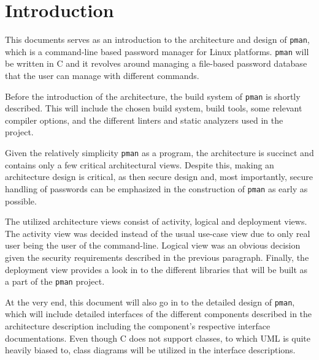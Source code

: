 \section{Introduction}

This documents serves as an introduction to the architecture and design of
\texttt{pman}, which is a command-line based password manager for Linux
platforms. \texttt{pman} will be written in C and it revolves around managing a
file-based password database that the user can manage with different commands.

Before the introduction of the architecture, the build system of \texttt{pman}
is shortly described. This will include the chosen build system, build tools,
some relevant compiler options, and the different linters and static analyzers
used in the project.

Given the relatively simplicity \texttt{pman} as a program, the architecture
is succinct and contains only a few critical architectural views. Despite this,
making an architecture design is critical, as then secure design and, most
importantly, secure handling of passwords can be emphasized in the construction
of \texttt{pman} as early as possible.

The utilized architecture views consist of activity, logical and deployment views.
The activity view was decided instead of the usual use-case view due to only real
user being the user of the command-line. Logical view was an obvious decision given
the security requirements described in the previous paragraph. Finally, the
deployment view provides a look in to the different libraries that will be
built as a part of the \texttt{pman} project.

At the very end, this document will also go in to the detailed design of
\texttt{pman}, which will include detailed interfaces of the different components
described in the architecture description including the component's respective
interface documentations. Even though C does not support classes, to which UML
is quite heavily biased to, class diagrams will be utilized in the interface
descriptions.
